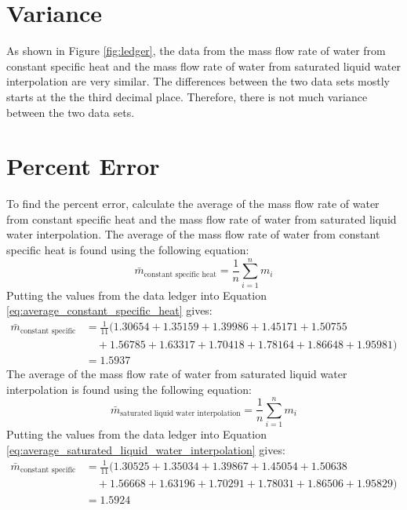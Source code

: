 \documentclass[12pt, titlepage]{article}
\begin{document}
\section{Variance}
As shown in Figure \ref{fig:ledger}, the data from the mass flow rate of water
from constant specific heat and the mass flow rate of water from saturated liquid
water interpolation are very similar. The differences between the two data sets
mostly starts at the the third decimal place. Therefore, there is not much variance
between the two data sets.
\section{Percent Error}
To find the percent error, calculate the average of the mass flow rate of water
from constant specific heat and the mass flow rate of water from saturated liquid
water interpolation. The average of the mass flow rate of water from constant
specific heat is found using the following equation:
\begin{equation}
  \bar{m}_{\text{constant specific heat}} = \frac{1}{n}\sum_{i=1}^{n}m_i
  \label{eq:average_constant_specific_heat}
\end{equation}
Putting the values from the data ledger into Equation
\ref{eq:average_constant_specific_heat} gives:
\begin{align}
  \bar{m}_{\text{constant specific heat}} &= \frac{1}{11}(1.30654 + 1.35159 + 1.39986 + 1.45171 + 1.50755 \nonumber \\
  &\quad + 1.56785 + 1.63317 + 1.70418 + 1.78164 + 1.86648 + 1.95981) \nonumber \\
  &= 1.5937
  \label{eq:average_constant_specific_heat_values}
\end{align}
The average of the mass flow rate of water from saturated liquid water interpolation
is found using the following equation:
\begin{equation}
  \bar{m}_{\text{saturated liquid water interpolation}} = \frac{1}{n}\sum_{i=1}^{n}m_i
  \label{eq:average_saturated_liquid_water_interpolation}
\end{equation}
Putting the values from the data ledger into Equation
\ref{eq:average_saturated_liquid_water_interpolation} gives:
\begin{align}
  \bar{m}_{\text{constant specific heat}} &= \frac{1}{11}(1.30525 + 1.35034 + 1.39867 + 1.45054 + 1.50638 \nonumber \\
  &\quad + 1.56668 + 1.63196 + 1.70291 + 1.78031 + 1.86506 + 1.95829) \nonumber \\
  &= 1.5924
  \label{eq:average_saturated_liquid_water_interpolation_values}
\end{align}
\end{document}
